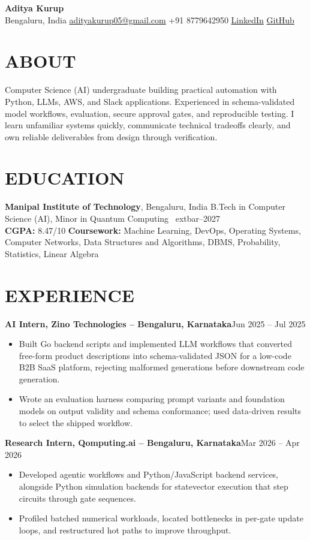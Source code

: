 \documentclass[10pt,letterpaper]{article}
\newcommand{\resumeRole}[2]{\textbf{#1}\hfill{\color{gray}#2}\\[-1pt]}
\newcommand{\resumeBullet}[1]{\item \small #1}
\begin{document}
\begin{center}
  {\color{navy}\fontsize{19}{21}\selectfont\textbf{Aditya Kurup}}\\[2pt]
  \small Bengaluru, India \textbar\; \href{mailto:adityakurup05@gmail.com}{adityakurup05@gmail.com} \textbar\; +91 8779642950 \textbar\; \href{https://linkedin.com/in/aditya-kurup}{LinkedIn} \textbar\; \href{https://github.com/aditya-kurup}{GitHub}
\end{center}

\section*{ABOUT}
Computer Science (AI) undergraduate building practical automation with Python, LLMs, AWS, and Slack applications. Experienced in schema-validated model workflows, evaluation, secure approval gates, and reproducible testing. I learn unfamiliar systems quickly, communicate technical tradeoffs clearly, and own reliable deliverables from design through verification.

\section*{EDUCATION}
\textbf{Manipal Institute of Technology}, Bengaluru, India \hfill {\color{gray}B.Tech in Computer Science (AI), Minor in Quantum Computing \	extbar--2027}\\[-1pt]
\small \textbf{CGPA:} 8.47/10 \textbar\; \textbf{Coursework:} Machine Learning, DevOps, Operating Systems, Computer Networks, Data Structures and Algorithms, DBMS, Probability, Statistics, Linear Algebra

\section*{EXPERIENCE}
\resumeRole{AI Intern, Zino Technologies -- Bengaluru, Karnataka}{Jun 2025 -- Jul 2025}
\begin{itemize}
  \resumeBullet{Built Go backend scripts and implemented LLM workflows that converted free-form product descriptions into schema-validated JSON for a low-code B2B SaaS platform, rejecting malformed generations before downstream code generation.}
  \resumeBullet{Wrote an evaluation harness comparing prompt variants and foundation models on output validity and schema conformance; used data-driven results to select the shipped workflow.}
\end{itemize}
\resumeRole{Research Intern, Qomputing.ai -- Bengaluru, Karnataka}{Mar 2026 -- Apr 2026}
\begin{itemize}
  \resumeBullet{Developed agentic workflows and Python/JavaScript backend services, alongside Python simulation backends for statevector execution that step circuits through gate sequences.}
  \resumeBullet{Profiled batched numerical workloads, located bottlenecks in per-gate update loops, and restructured hot paths to improve throughput.}
\end{itemize}
\end{document}
